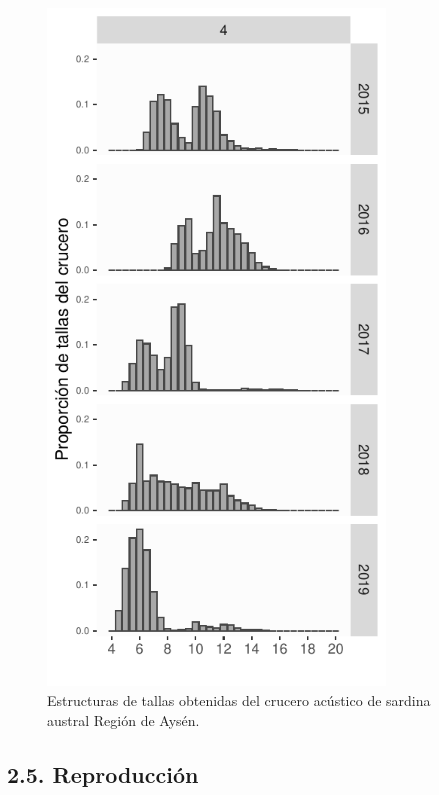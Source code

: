 \documentclass[
  spanish,
]{article}
\begin{document}
\begin{figure}[htb!]
\centering
\includegraphics[width=0.8\textwidth]{Figuras/Fig4_InformeFinal-1.pdf}
\caption{Estructuras de tallas obtenidas del crucero acústico  de sardina austral Región de Aysén.}
\label{Fig4}
\end{figure}

\pagebreak

\hypertarget{reproducciuxf3n}{%
\subsection{2.5. Reproducción}\label{reproducciuxf3n}}
\end{document}
